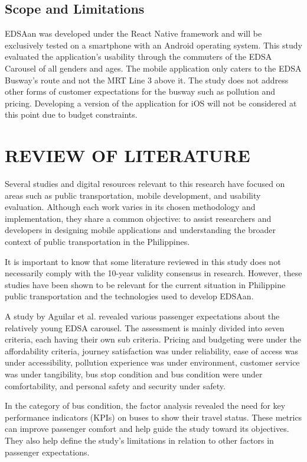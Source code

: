 \documentclass{icsthesis}
\begin{document}
\begin{mainmatter}
\subsection{Scope and Limitations}
EDSAan was developed under the React Native framework and will be exclusively tested on a smartphone with an Android operating system. This study evaluated the application’s usability through the commuters of the EDSA Carousel of all genders and ages.
The mobile application only caters to the EDSA Busway’s route and not the MRT Line 3 above it. The study does not address other forms of customer expectations for the busway such as pollution and pricing. Developing a version of the application for iOS will not be considered at this point due to budget constraints.
		
		\section{REVIEW OF LITERATURE}
Several studies and digital resources relevant to this research have focused on areas such as public transportation, mobile development, and usability evaluation. Although each work varies in its chosen methodology and implementation, they share a common objective: to assist researchers and developers in designing mobile applications and understanding the broader context of public transportation in the Philippines.

It is important to know that some literature reviewed in this study does not necessarily comply with the 10-year validity consensus in research. However, these studies have been shown to be relevant for the current situation in Philippine public transportation and the technologies used to develop EDSAan.

A study by Aguilar et al. \citep{Ref:001} revealed various passenger expectations about the relatively young EDSA carousel. The assessment is mainly divided into seven criteria, each having their own sub criteria. Pricing and budgeting were under the affordability criteria, journey satisfaction was under reliability,  ease of access was under accessibility, pollution experience was under environment, customer service was under tangibility, bus stop condition and bus condition were under comfortability, and personal safety and security under safety.

In the category of bus condition, the factor analysis revealed the need for key performance indicators (KPIs) on buses to show their travel status. These metrics can improve passenger comfort and help guide the study toward its objectives. They also help define the study’s limitations in relation to other factors in passenger expectations.


\end{mainmatter}
\end{document}
